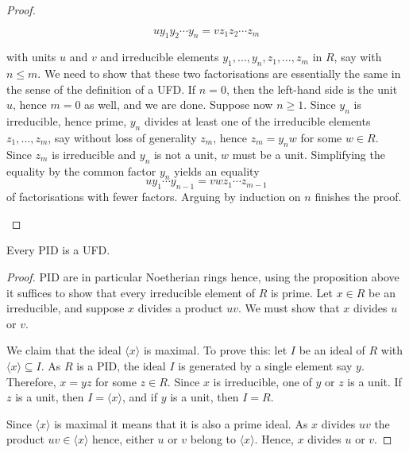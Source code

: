 \documentclass[12pt, a4paper]{article}
\begin{document}
\begin{proof}
\begin{enumerate}
\begin{itemize}
            \[ u y_1 y_2 \cdots y_n = v z_1 z_2 \cdots z_m \]
            
            with units \( u \) and \( v \) and irreducible elements \( y_1, \ldots, y_n, z_1, \ldots, z_m \) in \( R \), say with \( n \leq m \). We need to show that these two factorisations are essentially the same in the sense of the definition of a UFD. If \( n = 0 \), then the left-hand side is the unit \( u \), hence \( m = 0 \) as well, and we are done. Suppose now \( n \geq 1 \). Since \( y_n \) is irreducible, hence prime, \( y_n \) divides at least one of the irreducible elements \( z_1, \ldots, z_m \), say without loss of generality \( z_m \), hence \( z_m = y_n w \) for some \( w \in R \). Since \( z_m \) is irreducible and \( y_n \) is not a unit, \( w \) must be a unit. Simplifying the equality by the common factor \( y_n \) yields an equality
            \[ u y_1 \cdots y_{n-1} = v w z_1 \cdots z_{m-1} \]
            of factorisations with fewer factors. Arguing by induction on \( n \) finishes the proof.
        \end{itemize}
    \end{enumerate}
\end{proof}

\begin{mdprop}
    Every PID is a UFD.
\end{mdprop}

\begin{proof}
    PID are in particular Noetherian rings hence, using the proposition above it suffices to show that every irreducible element of \(R\) is prime. Let \(x\in R\) be an irreducible, and suppose \(x\) divides a product \(uv\). We must show that \(x\) divides \(u\) or \(v\). 

    We claim that the ideal \(\langle x \rangle\) is maximal. To prove this: let \(I\) be an ideal of \(R\) with \(\langle x\rangle \subseteq I\). As \(R\) is a PID, the ideal \(I\) is generated by a single element say \(y\). Therefore, \(x=yz\) for some \(z\in R\). Since \(x\) is irreducible, one of \(y\) or \(z\) is a unit. If \(z\) is a unit, then \(I=\langle x\rangle\), and if \(y\) is a unit, then \(I=R\). 

    Since \(\langle x \rangle\) is maximal it means that it is also a prime ideal. As \(x\) divides \(uv\) the product \(uv \in \langle x \rangle\) hence, either \(u\) or \(v\) belong to \(\langle x \rangle\). Hence, \(x\) divides \(u\) or \(v\).
\end{proof}
\end{document}
